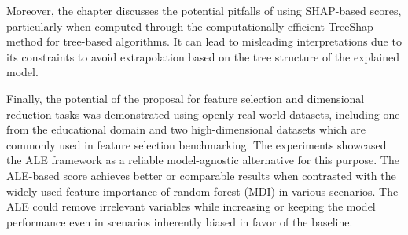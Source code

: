 Moreover, the chapter discusses the potential pitfalls of using \gls{SHAP}-based scores, particularly when computed through the computationally efficient TreeShap method for tree-based algorithms. It can lead to misleading interpretations due to its constraints to avoid extrapolation based on the tree structure of the explained model.

Finally, the potential of the proposal for feature selection and dimensional reduction tasks was demonstrated using openly real-world datasets, including one from the educational domain and two high-dimensional datasets which are commonly used in feature selection benchmarking. The experiments showcased the \gls{ALE} framework as a reliable model-agnostic alternative for this purpose. The ALE-based score achieves better or comparable results when contrasted with the widely used feature importance of random forest (\gls{MDI}) in various scenarios. The ALE could remove irrelevant variables while increasing or keeping the model performance even in scenarios inherently biased in favor of the baseline.
